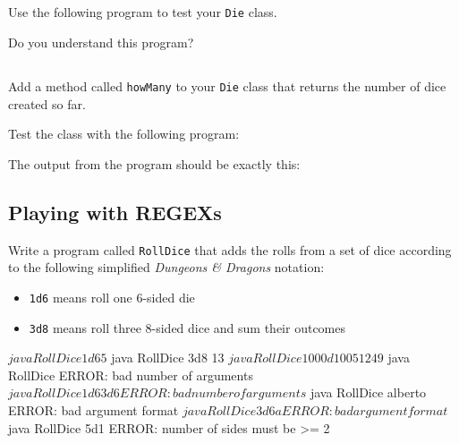 \documentclass[a4paper, 11pt]{article}
\begin{document}
\subsection{}

Use the following program to test your \verb+Die+ class.

Do you understand this program?







\subsection{}

Add a method called \texttt{howMany} to your \texttt{Die} class that returns
the number of dice created so far.

Test the class with the following program:


The output from the program should be exactly this:


\subsection{Playing with REGEXs}

Write a program called \texttt{RollDice} that adds the rolls from a set of dice
according to the following simplified \emph{Dungeons \& Dragons} notation:

\begin{itemize}

  \item \verb+1d6+ means roll one 6-sided die

  \item \verb+3d8+ means roll three 8-sided dice and sum their outcomes

\end{itemize}

\begin{cmd}
$ java RollDice 1d6
5
$ java RollDice 3d8
13
$ java RollDice 1000d100
51249
$ java RollDice
ERROR: bad number of arguments
$ java RollDice 1d6 3d6
ERROR: bad number of arguments
$ java RollDice alberto
ERROR: bad argument format
$ java RollDice 3d6a
ERROR: bad argument format
$ java RollDice 5d1
ERROR: number of sides must be >= 2
\end{cmd}
\end{document}
